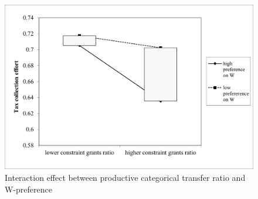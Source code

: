 \begin{figure}[H]
    \centering
    \includegraphics[scale=0.8]{Chapter-5/Figures/inter_cons_W.jpg}
    \caption[Interaction effect between productive categorical transfer ratio and W-preference]{Interaction effect between productive categorical transfer ratio and W-preference
        \texttt{} }
    \label{int_cons_W}
\end{figure}
